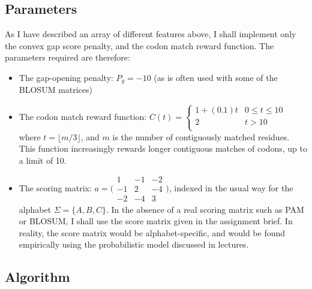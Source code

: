 \documentclass[a4paper]{article}
\begin{document}
\subsection{Parameters}
As I have described an array of different features above, I shall implement only the convex gap score penalty, and the codon match reward function. The parameters required are therefore:
\begin{itemize}
\item The gap-opening penalty: $P_g = -10$ (as is often used with some of the BLOSUM matrices)
\item The codon match reward function: $ C(t) = \begin{cases} 
      1 + (0.1)t & 0 \leq t \leq 10 \\
      2 & t > 10 \\
      \end{cases} $ where $t = \lfloor{m/3}\rfloor$, and $m$ is the number of contiguously matched residues. This function increasingly rewards longer contiguous matches of codons, up to a limit of 10. 
\item The scoring matrix: $a =  \bigl( \begin{smallmatrix}1 & -1 & -2\\ -1 & 2 & -4\\ -2 & -4 & 3\end{smallmatrix}\bigr)$, indexed in the usual way for the alphabet $\Sigma = \{A, B, C\}$. In the absence of a real scoring matrix such as PAM or BLOSUM, I shall use the score matrix given in the assignment brief. In reality, the score matrix would be alphabet-specific, and would be found empirically using the probabilistic model discussed in lectures. 

\end{itemize}
\subsection{Algorithm}
\end{document}
